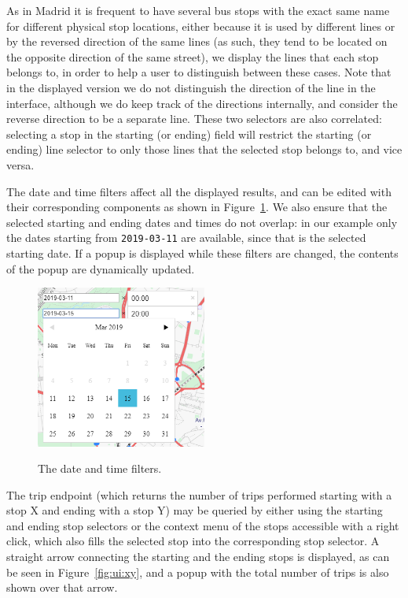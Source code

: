 	As in Madrid it is frequent to have several bus stops with the exact same name for different physical stop locations, either because it is used by different lines or by the reversed direction of the same lines (as such, they tend to be located on the opposite direction of the same street), we display the lines that each stop belongs to, in order to help a user to distinguish between these cases. Note that in the displayed version we do not distinguish the direction of the line in the interface, although we do keep track of the directions internally, and consider the reverse direction to be a separate line. These two selectors are also correlated: selecting a stop in the starting (or ending) field will restrict the starting (or ending) line selector to only those lines that the selected stop belongs to, and vice versa.
	
	The date and time filters affect all the displayed results, and can be edited with their corresponding components as shown in Figure~\ref{fig:ui:date}. We also ensure that the selected starting and ending dates and times do not overlap: in our example only the dates starting from \texttt{2019-03-11} are available, since that is the selected starting date. If a popup is displayed while these filters are changed, the contents of the popup are dynamically updated.
	
	\begin{figure}[ht]
		\begin{center}
			{\includegraphics[width=0.5\textwidth]{screens/date_cut.png}}
		\end{center}
		\vspace{-0.5cm}
		\caption{The date and time filters.}
		\label{fig:ui:date}
		\vspace{-0.5cm}
	\end{figure}
	
	\medskip
	The trip endpoint (which returns the number of trips performed starting with a stop X and ending with a stop Y) may be queried by either using the starting and ending stop selectors or the context menu of the stops accessible with a right click, which also fills the selected stop into the corresponding stop selector. A straight arrow connecting the starting and the ending stops is displayed, as can be seen in Figure~\ref{fig:ui:xy}, and a popup with the total number of trips is also shown over that arrow.
	
